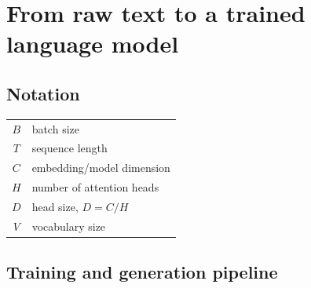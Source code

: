 \section{From raw text to a trained language model}

\subsection*{Notation}

\begin{tabular}{c l}
  \(B\) & batch size \\
  \(T\) & sequence length \\
  \(C\) & embedding/model dimension \\
  \(H\) & number of attention heads \\
  \(D\) & head size, \(D=C/H\) \\
  \(V\) & vocabulary size
\end{tabular}

\subsection*{Training and generation pipeline}

